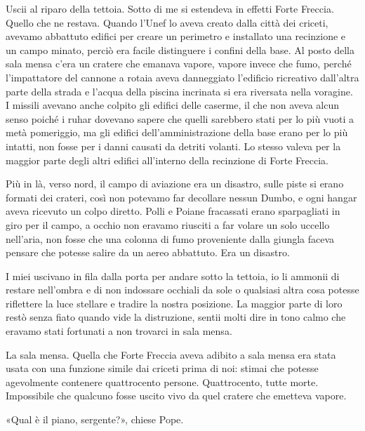 Uscii al riparo della tettoia. Sotto di me si estendeva in effetti Forte
Freccia. Quello che ne restava. Quando l'Unef lo aveva creato dalla
città dei criceti, avevamo abbattuto edifici per creare un perimetro e
installato una recinzione e un campo minato, perciò era facile
distinguere i confini della base. Al posto della sala mensa c'era un
cratere che emanava vapore, vapore invece che fumo, perché l'impattatore
del cannone a rotaia aveva danneggiato l'edificio ricreativo dall'altra
parte della strada e l'acqua della piscina incrinata si era riversata
nella voragine. I missili avevano anche colpito gli edifici delle
caserme, il che non aveva alcun senso poiché i ruhar dovevano sapere che
quelli sarebbero stati per lo più vuoti a metà pomeriggio, ma gli
edifici dell'amministrazione della base erano per lo più intatti, non
fosse per i danni causati da detriti volanti. Lo stesso valeva per la
maggior parte degli altri edifici all'interno della recinzione di Forte
Freccia.

Più in là, verso nord, il campo di aviazione era un disastro, sulle
piste si erano formati dei crateri, così non potevamo far decollare
nessun Dumbo, e ogni hangar aveva ricevuto un colpo diretto. Polli e
Poiane fracassati erano sparpagliati in giro per il campo, a occhio non
eravamo riusciti a far volare un solo uccello nell'aria, non fosse che
una colonna di fumo proveniente dalla giungla faceva pensare che potesse
salire da un aereo abbattuto. Era un disastro.

I miei uscivano in fila dalla porta per andare sotto la tettoia, io li
ammonii di restare nell'ombra e di non indossare occhiali da sole o
qualsiasi altra cosa potesse riflettere la luce stellare e tradire la
nostra posizione. La maggior parte di loro restò senza fiato quando vide
la distruzione, sentii molti dire in tono calmo che eravamo stati
fortunati a non trovarci in sala mensa.

La sala mensa. Quella che Forte Freccia aveva adibito a sala mensa era
stata usata con una funzione simile dai criceti prima di noi: stimai che
potesse agevolmente contenere quattrocento persone. Quattrocento, tutte
morte. Impossibile che qualcuno fosse uscito vivo da quel cratere che
emetteva vapore.

«Qual è il piano, sergente?», chiese Pope.

